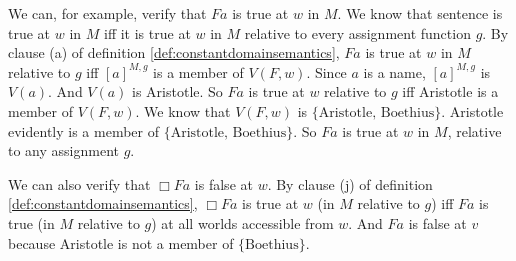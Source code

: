 We can, for example, verify that $Fa$ is true at $w$ in $M$. We know that
sentence is true at $w$ in $M$ iff it is true at $w$ in $M$ relative to every
assignment function $g$. By clause (a) of definition
\ref{def:constantdomainsemantics}, $Fa$ is true at $w$ in $M$ relative to $g$
iff $[a]^{M,g}$ is a member of $V(F,w)$. Since $a$ is a name, $[a]^{M,g}$ is
$V(a)$. And $V(a)$ is Aristotle. So $Fa$ is true at $w$ relative to $g$ iff
Aristotle is a member of $V(F,w)$. We know that $V(F,w)$ is $\{ \text{Aristotle,
  Boethius} \}$. Aristotle evidently is a member of $\{ \text{Aristotle,
  Boethius} \}$. So $Fa$ is true at $w$ in $M$, relative to any assignment $g$.

We can also verify that $\Box Fa$ is false at $w$. By clause (j) of definition
\ref{def:constantdomainsemantics}, $\Box Fa$ is true at $w$ (in $M$ relative to
$g$) iff $Fa$ is true (in $M$ relative to $g$) at all worlds accessible from
$w$. And $Fa$ is false at $v$ because Aristotle is not a member of $\{ \text{Boethius} \}$.




